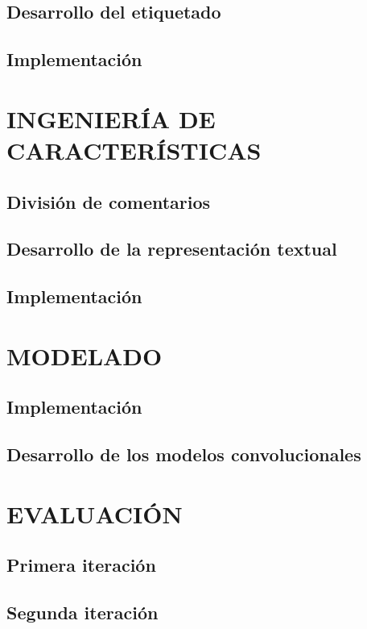 \subsection{Desarrollo del etiquetado}

\subsection{Implementación}

\section{INGENIERÍA DE CARACTERÍSTICAS}

\subsection{División de comentarios}

\subsection{Desarrollo de la representación textual}

\subsection{Implementación}

\section{MODELADO}

\subsection{Implementación}

\subsection{Desarrollo de los modelos convolucionales}

\section{EVALUACIÓN}

\subsection{Primera iteración}

\subsection{Segunda iteración}

